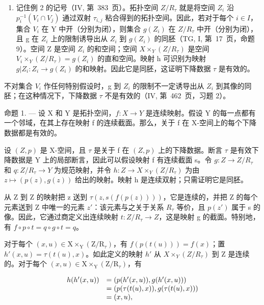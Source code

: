 \begin{enumerate}
\def\labelenumi{\arabic{enumi})}
\setcounter{enumi}{1}
\tightlist
\item
  记住例 2 的记号（IV, 第~383~页）。拓扑空间 \(Z/R_{\tau}\) 就是将空间 \(Z_{i}\) 沿 \(p_{i}^{-1}(V_{i} \cap V_{j})\) 通过双射 \(\tau_{i,j}\) 粘合得到的拓扑空间。因此，若对于每个 \(i \in I\)，集合 \(V_{i}\) 在 Y 中开（分别为闭），则集合 \(g(Z_{i})\) 在 \(Z/R_{\tau}\) 中开（分别为闭），且 g 在 \(Z_{i}\) 上的限制诱导出从 \(Z_{i}\) 到 \(g(Z_{i})\) 的同胚（TG, I, 第~17~页，命题 9）。空间 Z 是空间 \(Z_{i}\) 的和空间；空间 \(X \times_{Y}(Z/R_{\tau})\) 是空间 \(V_{i} \times_{Y}(Z/R_{\tau}) = g(Z_{i})\) 的直和空间。映射 h 可识别为映射 \(g|Z_{i}: Z_{i} \to g(Z_{i})\) 的和映射。因此它是同胚，这证明下降数据 \(\tau\) 是有效的。
\end{enumerate}

不对集合 \(V_{i}\) 作任何特别假设时，g 到 \(Z_{i}\) 的限制不一定诱导出从 \(Z_{i}\) 到其像的同胚；在这种情况下，下降数据 \(\tau\) 不是有效的（IV, 第~462~页，习题 2）。

命题 1. --- 设 X 和 Y 是拓扑空间，\(f: X \to Y\) 是连续映射。假设 Y 的每一点都有一个邻域，在其上存在映射 f 的连续截面。那么，关于 f 在 X-空间上的每个下降数据都是有效的。

设 \((Z,p)\) 是 X-空间，且 \(\tau\) 是关于 f 在 \((Z,p)\) 上的下降数据。断言 \(\tau\) 是有效下降数据是 Y 上的局部断言，因此可以假设映射 f 有连续截面 s。令 \(g: Z \to Z/R_{\tau}\) 和 \(q: Z/R_{\tau} \to Y\) 为规范映射，并令 \(h: Z \to X \times_{Y} (Z/R_{\tau})\) 为由 \(z \mapsto (p(z), g(z))\) 给出的映射。映射 h 是连续双射；只需证明它是同胚。

从 Z 到 Z 的映射把 z 送到 \(\tau(z,s(f(p(z))))\)，它是连续的，并把 Z 的每个元素送到 Z 中唯一的元素 \(z'\)：该元素与之关于关系 \(R_{\tau}\) 等价，且 \(p(z')\) 属于 s 的像。因此，它通过商定义出连续映射 \(t:Z/R_{\tau}\to Z\)，这是映射 g 的截面。特别地，有 \(f\circ p\circ t=q\circ g\circ t=q\)。

对于每个 \((x,u)\in\mathrm{X}\times_{\mathrm{Y}}(\mathrm{Z}/\mathrm{R}_{\tau})\)，有 \(f(p(t(u)))=f(x)\)；置 \(h'(x,u)=\tau(t(u),x)\)。如此定义的映射 \(h'\) 从 \(X\times_{Y}(Z/R_{\tau})\) 到 Z 是连续的。对于每个 \((x,u)\in\mathrm{X}\times_{\mathrm{Y}}(\mathrm{Z}/\mathrm{R}_{\tau})\)，有

\[
\begin{array}{r l} h (h ^ {\prime} (x, u)) & = (p (h ^ {\prime} (x, u)), g (h ^ {\prime} (x, u))) \\ & = (p (\tau (t (u), x)), g (\tau (t (u), x))) \\ & = (x, u), \end{array}
\]

